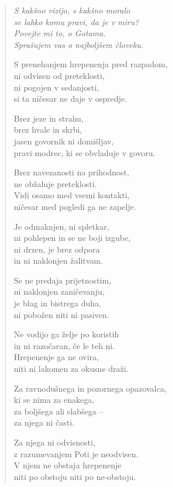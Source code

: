 \begin{verse}


\emph{S kakšno vizijo, s kakšno moralo\\
se lahko komu pravi, da je v miru?\\
Povejte mi to, o Gotama.\\
Sprašujem vas o najboljšem človeku.}

S prenehanjem hrepenenja pred razpadom,\\
ni odvisen od preteklosti,\\
ni pogojen v sedanjosti,\\
si ta ničesar ne daje v ospredje.

Brez jeze in strahu,\\
brez hvale in skrbi,\\
jasen govornik ni domišljav,\\
pravi modrec, ki se obvladuje v govoru.

Brez navezanosti na prihodnost,\\
ne obžaluje preteklosti.\\
Vidi osamo med vsemi kontakti,\\
ničesar med pogledi ga ne zapelje.

Je odmaknjen, ni spletkar,\\
ni pohlepen in se ne boji izgube,\\
ni drzen, je brez odpora\\
in ni naklonjen žalitvam.

Se ne predaja prijetnostim,\\
ni naklonjen zaničevanju,\\
je blag in bistrega duha,\\
ni pobožen niti ni pasiven.

Ne vodijo ga želje po koristih\\
in ni razočaran, če le teh ni.\\
Hrepenenje ga ne ovira,\\
niti ni lakomen za okusne draži.

Za ravnodušnega in pozornega opazovalca,\\
ki se nima za enakega,\\
za boljšega ali slabšega --\\
za njega ni časti.

Za njega ni odvisnosti,\\
z razumevanjem Poti je neodvisen.\\
V njem ne obstaja hrepenenje\\
niti po obstoju niti po ne-obstoju.


\end{verse}
